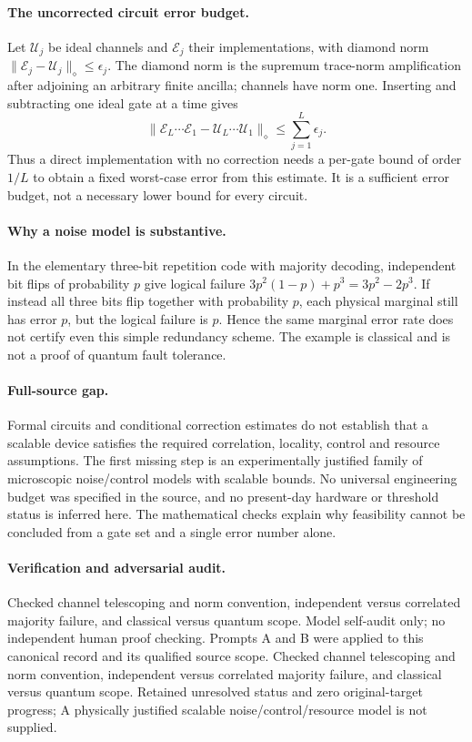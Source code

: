 \documentclass[11pt]{article}
\begin{document}
\paragraph{The uncorrected circuit error budget.} Let $\mathcal U_j$ be ideal channels and $\mathcal E_j$ their implementations, with diamond norm $\|\mathcal E_j-\mathcal U_j\|_\diamond\leq\epsilon_j$. The diamond norm is the supremum trace-norm amplification after adjoining an arbitrary finite ancilla; channels have norm one. Inserting and subtracting one ideal gate at a time gives
\[
 \|\mathcal E_L\cdots\mathcal E_1-\mathcal U_L\cdots\mathcal U_1\|_\diamond
 \leq\sum_{j=1}^L\epsilon_j.
\]
Thus a direct implementation with no correction needs a per-gate bound of order $1/L$ to obtain a fixed worst-case error from this estimate. It is a sufficient error budget, not a necessary lower bound for every circuit.

\paragraph{Why a noise model is substantive.} In the elementary three-bit repetition code with majority decoding, independent bit flips of probability $p$ give logical failure $3p^2(1-p)+p^3=3p^2-2p^3$. If instead all three bits flip together with probability $p$, each physical marginal still has error $p$, but the logical failure is $p$. Hence the same marginal error rate does not certify even this simple redundancy scheme. The example is classical and is not a proof of quantum fault tolerance.

\paragraph{Full-source gap.} Formal circuits and conditional correction estimates do not establish that a scalable device satisfies the required correlation, locality, control and resource assumptions. The first missing step is an experimentally justified family of microscopic noise/control models with scalable bounds. No universal engineering budget was specified in the source, and no present-day hardware or threshold status is inferred here. The mathematical checks explain why feasibility cannot be concluded from a gate set and a single error number alone.

\paragraph{Verification and adversarial audit.}
Checked channel telescoping and norm convention, independent versus correlated majority failure, and classical versus quantum scope. Model self-audit only; no independent human proof checking. Prompts A and B were applied to this canonical record and its qualified source scope. Checked channel telescoping and norm convention, independent versus correlated majority failure, and classical versus quantum scope. Retained unresolved status and zero original-target progress; A physically justified scalable noise/control/resource model is not supplied.
\end{document}
